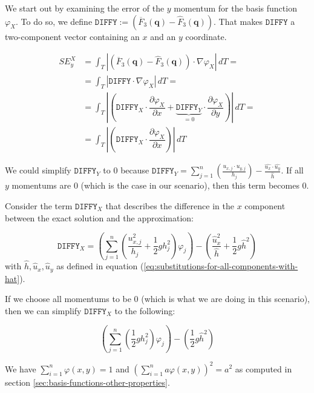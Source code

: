 \documentclass{article}
\newcommand{\pd}[2]{\dfrac{\partial #1}{\partial #2}}
\renewcommand{\phi}{\varphi}
\begin{document}
We start out by examining the error of the $y$ momentum for the basis function $\phi_X$. To do so, we define $\mathtt{DIFFY}:=\left( \overline{F}_3(\mathbf{q}) - \widehat{F}_3(\mathbf{q}) \right)$. That makes $\mathtt{DIFFY}$ a two-component vector containing an $x$ and an $y$ coordinate.

\begin{align*}
  SE_y^X &= \int_T \left| \left( \overline{F}_3(\mathbf{q}) - \widehat{F}_3(\mathbf{q}) \right) \cdot \nabla \phi_X \right| \, dT = \\
  &= \int_T \left| \mathtt{DIFFY} \cdot \nabla \phi_X \right|\,dT = \\
  &= \int_T \left| \left( \mathtt{DIFFY}_X \cdot \pd{\phi_X}{x} + \underbrace{\mathtt{DIFFY}_Y}_{=0} \cdot \pd{\phi_X}{y} \right) \right| \, dT = \\
  &=\int_T \left| \left( \mathtt{DIFFY}_X \cdot \pd{\phi_X}{x} \right) \right| \, dT
\end{align*}

We could simplify $\mathtt{DIFFY}_Y$ to 0 because $\mathtt{DIFFY}_Y=\sum_{j=1}^n\left( \frac{u_{x,j}\cdot u_{y,j}}{h_j} \right)-\frac{\widehat{u_x}\cdot\widehat{u_y}}{\widehat{h}}$. If all $y$ momentums are 0 (which is the case in our scenario), then this term becomes 0.

Consider the term $\mathtt{DIFFY}_X$ that describes the difference in the $x$ component between the exact solution and the approximation:

\begin{equation*}
  \mathtt{DIFFY}_X = \left( \sum_{j=1}^n \left(\frac{u_{x,j}^2}{h_j} + \frac{1}{2} g h_j^2\right) \phi_j \right) - \left( \frac{\widehat{u}_x^2}{\widehat h} + \frac{1}{2} g \widehat{h}^2\right)
\end{equation*}
with $\widehat h, \widehat{u}_x, \widehat{u}_y$ as defined in equation (\ref{eq:substitutions-for-all-components-with-hat}).

If we choose all momentums to be 0 (which is what we are doing in this scenario), then we can simplify $\mathtt{DIFFY}_X$ to the following:

\begin{equation*}
  \left( \sum_{j=1}^n \left(\frac{1}{2} g h_j^2\right) \phi_j \right) - \left( \frac{1}{2} g \widehat{h}^2\right)
\end{equation*}


We have $\sum_{i=1}^n \phi(x,y)=1$ and  $(\sum_{i=1}^n a \phi(x,y))^2 = a^2$ as computed in section \ref{sec:basis-functions-other-properties}.
\end{document}
